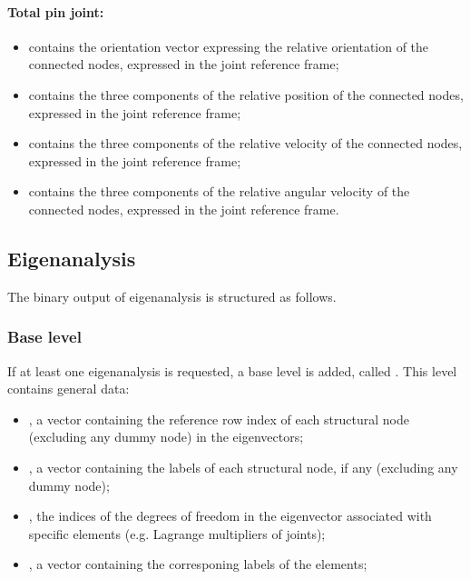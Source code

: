 \paragraph{Total pin joint:}
\begin{itemize}
\item {} contains the orientation vector
  expressing the relative orientation of the connected nodes, expressed in 
  the joint reference frame;
\item {} contains the three components of
  the relative position of the connected nodes, expressed in the joint 
  reference frame;
\item {} contains the three components of
  the relative velocity of the connected nodes, expressed in the joint 
  reference frame;
\item {} contains the three components
  of the relative angular velocity of the connected nodes, expressed in 
  the joint reference frame.
\end{itemize}


\subsection{Eigenanalysis}
\label{sec:NetCDF:Eigen}
The binary output of eigenanalysis is structured as follows.
\subsubsection{Base level}
If at least one eigenanalysis is requested, a base level is added, called .
This level contains general data:
\begin{itemize}
\item {}, a vector containing the reference row index of each structural node (excluding any dummy node) in the eigenvectors;
\item {}, a vector containing the labels of each structural node, if any (excluding any dummy node);
\item {}, the indices of the degrees of freedom in the eigenvector associated with specific elements (e.g. Lagrange multipliers of joints);
\item {}, a vector containing the corresponing labels of the elements;
\end{itemize}

